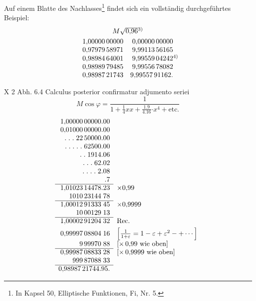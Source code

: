 Auf einem Blatte des Nachlasses\footnote{In Kapsel 50, Elliptische Funktionen, Fi, Nr. 5.} findet sich ein vollständig durchgeführtes Beispiel:
\[
\begin{array}{rr}
\multicolumn{2}{c}{M\sqrt{0{,}96}\text{\textsuperscript{3)}}}\\[3pt]
1{,}00000\,00000&0{,}00000\,00000\\
0{,}97979\,58971&9{,}99113\,56165\\
0{,}98984\,64001&9{,}99559\,04242\rlap{\text{\textsuperscript{4)}}}\\
0{,}98989\,79485&9{,}99556\,78082\\
0{,}98987\,21743&9{,}99557\,91162.
\end{array}
\]
\setcounter{footnote}{3}
\setcounter{footnote}{4}
\par\noindent X 2 Abh. 6.\hfill 4
\clearpage{}
\noindent\hspace*{\parindent}Calculus posterior confirmatur adjumento seriei
\[
M\cos\varphi=\frac{1}{1+\frac14xx+\frac{1\mathord{.}9}{4\mathord{.}16}\mathord{\cdot}x^4+\text{etc.}}
\]
\begingroup\small\setlength{\arraycolsep}{3pt}
\[
\begin{array}{rl}
1{,}00000\,00000\mathord{.}00&\\
0{,}01000\,00000\mathord{.}00&\\
\mathord{.}\;\mathord{.}\;\mathord{.}\;22\,50000\mathord{.}00&\\
\mathord{.}\;\mathord{.}\;\mathord{.}\;\mathord{.}\;\mathord{.}\;62500\mathord{.}00&\\
\mathord{.}\;\mathord{.}\;1914\mathord{.}06&\\
\mathord{.}\;\mathord{.}\;\mathord{.}\;62\mathord{.}02&\\
\mathord{.}\;\mathord{.}\;\mathord{.}\;\mathord{.}\;2\mathord{.}08&\\
\mathord{.}7&\\\cline{1-1}
1{,}01023\,14478\mathord{.}23&\times0{,}99\\
1010\,23144\;78&\\\cline{1-1}
1{,}00012\,91333\;45&\times0{,}9999\\
10\,00129\;13&\\\cline{1-1}
1{,}00002\,91204\;32&\text{Rec.}\\[3pt]
0{,}99997\,08804\;16&\left[\frac{1}{1+\varepsilon}=1-\varepsilon+\varepsilon^2-+\cdots\right]\\[3pt]
9\,99970\;88&[\times\,0{,}99\ \text{wie oben}]\\\cline{1-1}
0{,}99987\,08833\;28&[\times\,0{,}9999\ \text{wie oben}]\\
999\,87088\;33&\\\cline{1-1}
0{,}98987\,21744\mathord{.}95.&
\end{array}
\]

